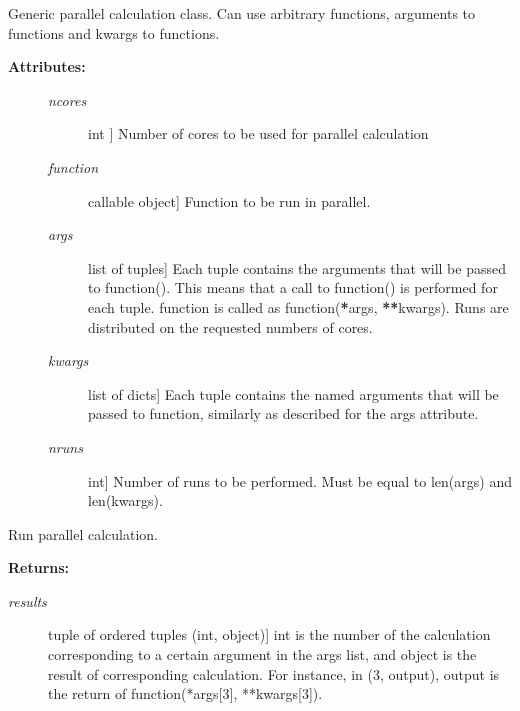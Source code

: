 \documentclass[letterpaper,10pt,english]{sphinxmanual}
\begin{document}
\begin{fulllineitems}
\label{index:encore.utils.ParallelCalculation}
Generic parallel calculation class. Can use arbitrary functions,
arguments to functions and kwargs to functions.
\begin{description}
\item[{\textbf{Attributes:}}] \leavevmode\begin{description}
\item[{\emph{ncores}}] \leavevmode{[}int {]}
Number of cores to be used for parallel calculation

\item[{\emph{function}}] \leavevmode{[}callable object{]}
Function to be run in parallel.

\item[{\emph{args}}] \leavevmode{[}list of tuples{]}
Each tuple contains the arguments that will be passed to function(). This means that a call to function() is performed for each tuple. function is called as function({\color{red}\bfseries{}*}args, {\color{red}\bfseries{}**}kwargs). Runs are distributed on the requested numbers of cores.

\item[{\emph{kwargs}}] \leavevmode{[}list of dicts{]}
Each tuple contains the named arguments that will be passed to function, similarly as described for the args attribute.

\item[{\emph{nruns}}] \leavevmode{[}int{]}
Number of runs to be performed. Must be equal to len(args) and len(kwargs).

\end{description}

\end{description}

\begin{fulllineitems}
\label{index:encore.utils.ParallelCalculation.run}
Run parallel calculation.

\textbf{Returns:}
\begin{description}
\item[{\emph{results}}] \leavevmode{[}tuple of ordered tuples (int, object){]}
int is the number of the calculation corresponding to a certain argument in the args list, and object is the result of corresponding calculation. For instance, in (3, output), output is the return of function(*args{[}3{]}, **kwargs{[}3{]}).


\end{description}
\end{fulllineitems}
\end{fulllineitems}
\end{document}
